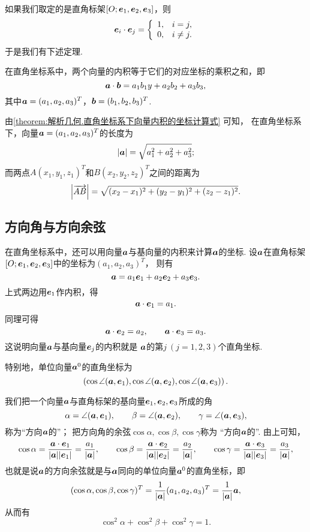 如果我们取定的是直角标架\([O;\boldsymbol{e}_1,\boldsymbol{e}_2,\boldsymbol{e}_3]\)，则\[
	\boldsymbol{e}_i \cdot \boldsymbol{e}_j = \left\{ \begin{array}{ll}
		1, & i = j, \\
		0, & i \neq j.
	\end{array} \right.
\]
于是我们有下述定理.
\begin{theorem}\label{theorem:解析几何.直角坐标系下向量内积的坐标计算式}
在直角坐标系中，两个向量的内积等于它们的对应坐标的乘积之和，即
\begin{equation}
	\boldsymbol{a}\cdot\boldsymbol{b}
	= a_1 b_1 y + a_2 b_2 + a_3 b_3,
\end{equation}
其中\(\boldsymbol{a}=(a_1,a_2,a_3)^T\)，\(\boldsymbol{b}=(b_1,b_2,b_3)^T\).
\end{theorem}

由\cref{theorem:解析几何.直角坐标系下向量内积的坐标计算式} 可知，
在直角坐标系下，向量\(\boldsymbol{a}=(a_1,a_2,a_3)^T\)的长度为\begin{equation}
	\abs{\boldsymbol{a}} = \sqrt{a_1^2+a_2^2+a_3^2};
\end{equation}
而两点\(A(x_1,y_1,z_1)^T\)和\(B(x_2,y_2,z_2)^T\)之间的距离为\begin{equation}
	\abs{\overrightarrow{AB}} = \sqrt{(x_2-x_1)^2+(y_2-y_1)^2+(z_2-z_1)^2}.
\end{equation}

\subsection{方向角与方向余弦}
在直角坐标系中，还可以用向量\(\boldsymbol{a}\)与基向量的内积来计算\(\boldsymbol{a}\)的坐标.
设\(\boldsymbol{a}\)在直角标架\([O;\boldsymbol{e}_1,\boldsymbol{e}_2,\boldsymbol{e}_3]\)中的坐标为\((a_1,a_2,a_3)^T\)，
则有\[
	\boldsymbol{a}=a_1 \boldsymbol{e}_1 + a_2 \boldsymbol{e}_2 + a_3 \boldsymbol{e}_3.
\]
上式两边用\(\boldsymbol{e}_1\)作内积，得\[
	\boldsymbol{a}\cdot\boldsymbol{e}_1 = a_1.
\]
同理可得\[
	\boldsymbol{a}\cdot\boldsymbol{e}_2 = a_2, \qquad
	\boldsymbol{a}\cdot\boldsymbol{e}_3 = a_3.
\]
这说明向量\(\boldsymbol{a}\)与基向量\(\boldsymbol{e}_j\)的内积就是
\(\boldsymbol{a}\)的第\(j\ (j=1,2,3)\)个直角坐标.

特别地，单位向量\(\boldsymbol{a}^0\)的直角坐标为\[
	\left( \cos\angle(\boldsymbol{a},\boldsymbol{e}_1),
	\cos\angle(\boldsymbol{a},\boldsymbol{e}_2),
	\cos\angle(\boldsymbol{a},\boldsymbol{e}_3) \right).
\]

我们把一个向量\(\boldsymbol{a}\)与直角标架的基向量\(\boldsymbol{e}_1,\boldsymbol{e}_2,\boldsymbol{e}_3\)所成的角\[
	\alpha=\angle(\boldsymbol{a},\boldsymbol{e}_1), \qquad
	\beta=\angle(\boldsymbol{a},\boldsymbol{e}_2), \qquad
	\gamma=\angle(\boldsymbol{a},\boldsymbol{e}_3),
\]称为“方向\(\boldsymbol{a}\)的”；
把方向角的余弦\(\cos\alpha,\cos\beta,\cos\gamma\)称为
“方向\(\boldsymbol{a}\)的”.
由上可知，\[
	\cos\alpha
	= \frac{\boldsymbol{a}\cdot\boldsymbol{e}_1}{\abs{\boldsymbol{a}}\abs{\boldsymbol{e}_1}}
	= \frac{a_1}{\abs{\boldsymbol{a}}},
	\qquad
	\cos\beta
	= \frac{\boldsymbol{a}\cdot\boldsymbol{e}_2}{\abs{\boldsymbol{a}}\abs{\boldsymbol{e}_2}}
	= \frac{a_2}{\abs{\boldsymbol{a}}},
	\qquad
	\cos\gamma
	= \frac{\boldsymbol{a}\cdot\boldsymbol{e}_3}{\abs{\boldsymbol{a}}\abs{\boldsymbol{e}_3}}
	= \frac{a_3}{\abs{\boldsymbol{a}}},
\]
也就是说\(\boldsymbol{a}\)的方向余弦就是与\(\boldsymbol{a}\)同向的单位向量\(\boldsymbol{a}^0\)的直角坐标，即\[
	(\cos\alpha,\cos\beta,\cos\gamma)^T
	= \frac{1}{\abs{\boldsymbol{a}}} (a_1,a_2,a_3)^T
	= \frac{1}{\abs{\boldsymbol{a}}} \boldsymbol{a},
\]
从而有\[
	\cos^2\alpha+\cos^2\beta+\cos^2\gamma=1.
\]

